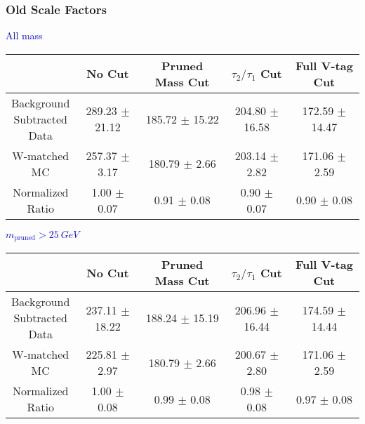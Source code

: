 \documentclass{beamer}
\begin{document}
\begin{frame}
  \frametitle{Old Scale Factors}

  \begin{adjustwidth}{-1.5em}{-1.5em}
    \centering
    \vspace{6pt}
    \textcolor{blue}{All mass}
    \vspace{6pt}

    {\scriptsize
      \begin{tabular}{c | c | c | c | c}
        \hline
        & No Cut & Pruned Mass Cut & $\tau_2/\tau_1$ Cut & Full V-tag Cut \\
        \hline
        \makecell{Background \\ Subtracted \\ Data} & 289.23 $\pm$ 21.12 & 185.72 $\pm$ 15.22 & 204.80 $\pm$ 16.58 & 172.59 $\pm$ 14.47 \\
        \makecell{W-matched \\ MC} & 257.37 $\pm$ 3.17 & 180.79 $\pm$ 2.66 & 203.14 $\pm$ 2.82 & 171.06 $\pm$ 2.59 \\
        \hline
        \makecell{Normalized \\ Ratio} & 1.00 $\pm$ 0.07 & 0.91 $\pm$ 0.08 & 0.90 $\pm$ 0.07 & 0.90 $\pm$ 0.08 \\
        \hline
      \end{tabular}
    }
    
    \vspace{6pt}
    \textcolor{blue}{$m_\text{pruned} > \SI{25}{GeV}$}
    \vspace{6pt}
    
    {\scriptsize
      \begin{tabular}{c | c | c | c | c}
        \hline
        & No Cut & Pruned Mass Cut & $\tau_2/\tau_1$ Cut & Full V-tag Cut \\
        \hline
        \makecell{Background \\ Subtracted \\ Data} & 237.11 $\pm$ 18.22 & 188.24 $\pm$ 15.19 & 206.96 $\pm$ 16.44 & 174.59 $\pm$ 14.44 \\
        \makecell{W-matched \\ MC} & 225.81 $\pm$ 2.97 & 180.79 $\pm$ 2.66 & 200.67 $\pm$ 2.80 & 171.06 $\pm$ 2.59 \\
        \hline
        \makecell{Normalized \\ Ratio} & 1.00 $\pm$ 0.08 & 0.99 $\pm$ 0.08 & 0.98 $\pm$ 0.08 & 0.97 $\pm$ 0.08 \\
        \hline
      \end{tabular}
    }
  \end{adjustwidth}
\end{frame}
\end{document}
